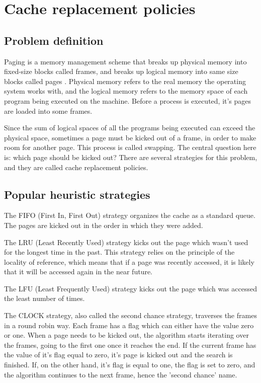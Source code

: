 \section{Cache replacement policies}
\subsection{Problem definition}
Paging is a memory management scheme that breaks up physical memory into fixed-size blocks called frames, and breaks up logical memory into same size blocks called pages \citep{silberschatz2018operatingsystem}. Physical memory refers to the real memory the operating system works with, and the logical memory refers to the memory space of each program being executed on the machine. Before a process is executed, it's pages are loaded into some frames.

Since the sum of logical spaces of all the programs being executed can exceed the physical space, sometimes a page must be kicked out of a frame, in order to make room for another page. This process is called swapping. The central question here is: which page should be kicked out? There are several strategies for this problem, and they are called cache replacement policies.

\subsection{Popular heuristic strategies}
The FIFO (First In, First Out) strategy organizes the cache as a standard queue. The pages are kicked out in the order in which they were added.

The LRU (Least Recently Used) strategy kicks out the page which wasn't used for the longest time in the past. This strategy relies on the principle of the locality of reference, which means that if a page was recently accessed, it is likely that it will be accessed again in the near future.

The LFU (Least Frequently Used) strategy kicks out the page which was accessed the least number of times.

The CLOCK strategy, also called the second chance strategy, traverses the frames in a round robin way. Each frame has a flag which can either have the value zero or one. When a page needs to be kicked out, the algorithm starts iterating over the frames, going to the first one once it reaches the end. If the current frame has the value of it's flag equal to zero, it's page is kicked out and the search is finished. If, on the other hand, it's flag is equal to one, the flag is set to zero, and the algorithm continues to the next frame, hence the 'second chance' name.

